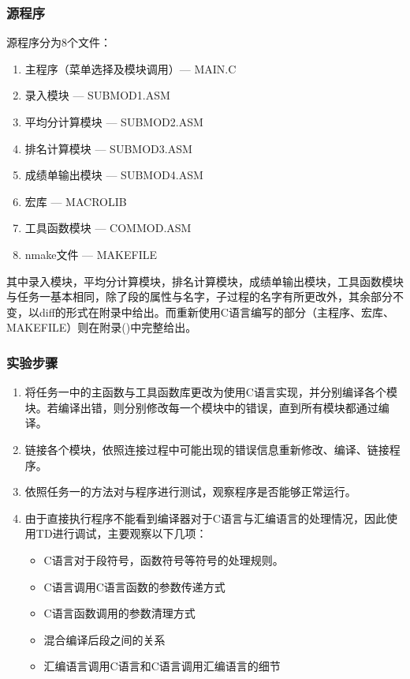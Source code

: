 \documentclass{article}
\begin{document}
	\subsubsection{源程序}
	源程序分为8个文件：
	\begin{enumerate}
		\item 主程序（菜单选择及模块调用）--- MAIN.C
		\item 录入模块 --- SUBMOD1.ASM
		\item 平均分计算模块 --- SUBMOD2.ASM
		\item 排名计算模块 --- SUBMOD3.ASM
		\item 成绩单输出模块 --- SUBMOD4.ASM
		\item 宏库 --- MACROLIB
		\item 工具函数模块 --- COMMOD.ASM
		\item nmake文件 --- MAKEFILE
	\end{enumerate} \par
	其中录入模块，平均分计算模块，排名计算模块，成绩单输出模块，工具函数模块与任务一基本相同，除了段的属性与名字，子过程的名字有所更改外，其余部分不变，以diff的形式在附录中给出。而重新使用C语言编写的部分（主程序、宏库、MAKEFILE）则在附录(\pageref{code:3_2})中完整给出。

	\subsubsection{实验步骤}
	\begin{enumerate}
		\item 将任务一中的主函数与工具函数库更改为使用C语言实现，并分别编译各个模块。若编译出错，则分别修改每一个模块中的错误，直到所有模块都通过编译。
		\item 链接各个模块，依照连接过程中可能出现的错误信息重新修改、编译、链接程序。
		\item 依照任务一的方法对与程序进行测试，观察程序是否能够正常运行。
		\item 由于直接执行程序不能看到编译器对于C语言与汇编语言的处理情况，因此使用TD进行调试，主要观察以下几项：
			\begin{itemize}
				\item C语言对于段符号，函数符号等符号的处理规则。
				\item C语言调用C语言函数的参数传递方式
				\item C语言函数调用的参数清理方式
				\item 混合编译后段之间的关系
				\item 汇编语言调用C语言和C语言调用汇编语言的细节
			\end{itemize}
	\end{enumerate}
\end{document}
